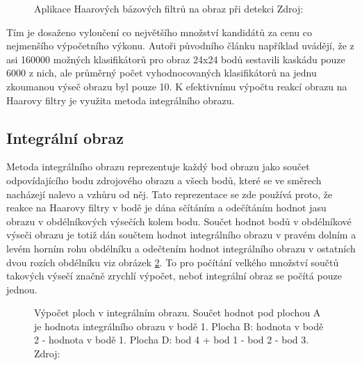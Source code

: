 	\begin{figure}[!ht] 
		\caption{Aplikace Haarových bázových filtrů na obraz při detekci Zdroj: \cite{viola2001rapid}} 	\label{haar_faces}
	\end{figure} 
	
	Tím je dosaženo vyloučení co největšího množství kandidátů za cenu co nejmenšího výpočetního výkonu. Autoři původního článku například uvádějí, že z asi 160000 možných klasifikátorů pro obraz 24x24 bodů sestavili kaskádu pouze 6000 z nich, ale průměrný počet vyhodnocovaných klasifikátorů na jednu zkoumanou výseč obrazu byl pouze 10. K efektivnímu výpočtu reakcí obrazu na Haarovy filtry je využita metoda integrálního obrazu.
	
\subsection{Integrální obraz}
	Metoda integrálního obrazu reprezentuje každý bod obrazu jako součet odpovídajícího bodu zdrojového obrazu a všech bodů, které se ve směrech nacházejí nalevo a vzhůru od něj. Tato reprezentace se zde používá proto, že reakce na Haarovy filtry v bodě je dána sčítáním a odečítáním hodnot jasu obrazu v obdélníkových výsečích kolem bodu. Součet hodnot bodů v obdélníkové výseči obrazu je totiž dán součtem hodnot integrálního obrazu v pravém dolním a levém horním rohu obdélníku a odečtením hodnot integrálního obrazu v ostatních dvou rozích obdélníku viz obrázek \ref{haar_integral}. To pro počítání velkého množství součtů takových výsečí značně zrychlí výpočet, neboť integrální obraz se počítá pouze jednou.
	
	\begin{figure}[!ht] 
		\caption{Výpočet ploch v integrálním obrazu. Součet hodnot pod plochou A je hodnota integrálního obrazu v bodě 1. Plocha B: hodnota v bodě 2 - hodnota v bodě 1. Plocha D: bod 4 + bod 1 - bod 2 - bod 3. Zdroj: \cite{viola2001rapid}} 	\label{haar_integral}
	\end{figure} 
	
